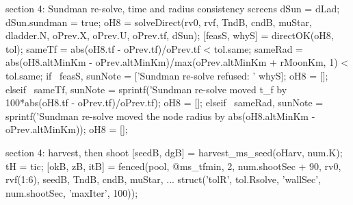 \documentclass[11pt]{article}
\begin{document}
\begin{snippet}{section 4: Sundman re-solve, time and radius consistency screens}
dSun = dLad;  dSun.sundman = true;
oH8 = solveDirect(rv0, rvf, TndB, cndB, muStar, dladder.N, oPrev.X, oPrev.U, oPrev.tf, dSun);
[feasS, whyS] = directOK(oH8, tol);
sameTf  = abs(oH8.tf - oPrev.tf)/oPrev.tf < tol.same;
sameRad = abs(oH8.altMinKm - oPrev.altMinKm)/max(oPrev.altMinKm + rMoonKm, 1) < tol.same;
if ~feasS,       sunNote = ['Sundman re-solve refused: ' whyS];  oH8 = [];
elseif ~sameTf,  sunNote = sprintf('Sundman re-solve moved t_f by %
                                   100*abs(oH8.tf - oPrev.tf)/oPrev.tf);  oH8 = [];
elseif ~sameRad, sunNote = sprintf('Sundman re-solve moved the node radius by %
                                   abs(oH8.altMinKm - oPrev.altMinKm));  oH8 = [];
\end{snippet}
\begin{snippet}{section 4: harvest, then shoot}
[seedB, dgB] = harvest_ms_seed(oHarv, num.K);
tH = tic;
[okB, zB, itB] = fenced(pool, @ms_tfmin, 2, num.shootSec + 90, rv0, rvf(1:6), seedB, TndB, cndB, muStar, ...
                        struct('tolR', tol.Rsolve, 'wallSec', num.shootSec, 'maxIter', 100));
\end{snippet}
\end{document}
